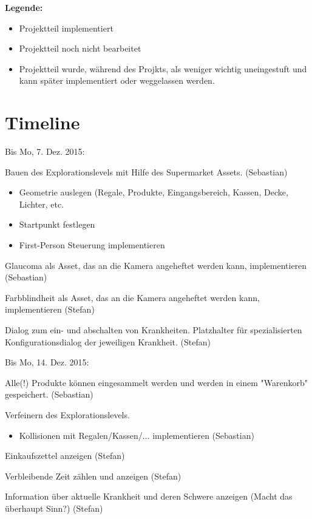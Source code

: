 \documentclass[a4paper, 11pt]{scrartcl}
\title{\documenttitle}
\author{\authors}
\date{\dateversion}
\newcommand{\fertig}{\color{ForestGreen}}
\newcommand{\unwichtig}{\color{Gray}}
\newcommand{\entwickler}[1]{\textcolor{BurntOrange}{(#1)}}
\newcommand{\Stefan}{\entwickler{Stefan}}
\newcommand{\Sebastian}{\entwickler{Sebastian}}
\begin{document}
\maketitle

{\bfseries Legende:}
\begin{itemize}
    \item {\fertig Projektteil implementiert}
    \item {Projektteil noch nicht bearbeitet}
    \item {\unwichtig Projektteil wurde, während des Projkts, als weniger
    wichtig uneingestuft und kann später implementiert oder weggelassen werden.}
\end{itemize}


\section{Timeline}
Bis Mo, 7. Dez. 2015:
\begin{enumerate}
    {\fertig
    \item Bauen des Explorationslevels mit Hilfe des Supermarket Assets. \Sebastian
    \begin{itemize}
        \item Geometrie auslegen (Regale, Produkte, Eingangsbereich, Kassen, Decke, Lichter, etc.
        \item Startpunkt festlegen
        \item First-Person Steuerung implementieren
    \end{itemize}
    }
    \item Glaucoma als Asset, das an die Kamera angeheftet werden kann, implementieren \Sebastian
    {\fertig \item Farbblindheit als Asset, das an die Kamera angeheftet werden kann, implementieren \Stefan}
    {\fertig \item Dialog zum ein- und abschalten von Krankheiten. Platzhalter für spezialisierten Konfigurationsdialog der jeweiligen Krankheit. \Stefan}
\end{enumerate}
Bis Mo, 14. Dez. 2015:
\begin{enumerate}
    \item Alle(!) Produkte können eingesammelt werden und werden in einem "Warenkorb" gespeichert. \Sebastian
    {\fertig
    \item Verfeinern des Explorationslevels.
    \begin{itemize}
        \item Kollisionen mit Regalen/Kassen/... implementieren \Sebastian
    \end{itemize}
    }
    \item Einkaufszettel anzeigen \Stefan
    \item Verbleibende Zeit zählen und anzeigen \Stefan
    {\unwichtig \item Information über aktuelle Krankheit und deren Schwere anzeigen (Macht das überhaupt Sinn?) \Stefan }
\end{enumerate}
\end{document}
